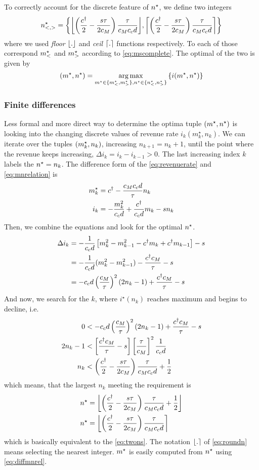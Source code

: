\documentclass[a4paper]{report}
\DeclarePairedDelimiter\floor{\lfloor}{\rfloor}
\DeclarePairedDelimiter\ceil{\lceil}{\rceil}
\DeclarePairedDelimiter{\nint}{\lfloor}{\rceil}
\DeclareMathOperator*{\argmax}{arg\,max}
\begin{document}
To correctly account for the discrete feature of $n^\star$, we define two integers
\def\nsd{\left(\frac{\cd}{2}-\frac{s\tau}{2c_M}\right)\frac{\tau}{c_Mc_cd}}
\begin{equation}
	n^\star_{<,>} = \left\{\floor*{\nsd}, \ceil*{\nsd}\right\}\label{eq:twons}
\end{equation}
where we used \emph{floor} $\floor*{.}$ and \emph{ceil} $\ceil*{.}$ functions respectively. To each of those correspond $m^{\star}_<$ and $m^{\star}_>$ according to \autoref{eq:mscomplete}. The optimal of the two is given by
\begin{equation*}
	(\ms,\ns)=\argmax\limits_{\ms\in\{\ms_<,\ms_>\},\ns\in\{\ns_<,\ns_>\}}\left\{i(\ms,\ns)\right\}
\end{equation*}

\subsubsection{Finite differences}
Less formal and more direct way to determine the optima tuple $(m^{\star},n^\star)$ is looking into the changing discrete values of revenue rate $i_k(m^\star_k,n_k)$. We can iterate over the tuples $(m^{\star}_k,n_k)$, increasing $n_{k+1}=n_k+1$, until the point where the revenue keeps increasing, $\Delta i_k=i_k-i_{k-1}>0$. The last increasing index $k$ labels the $n^\star=n_k$. The difference form of the \autoref{eq:revenuerate} and \autoref{eq:mnrelation} is
\begin{align}
	m^{\star}_k&=c^{\dagger} - \frac{c_Mc_cd}{\tau} n_k \label{eq:diffmnrel}\\
	i_k&=-\frac{m_k^2}{c_cd}+\frac{c^{\dagger}}{c_cd}m_k-sn_k \label{eq:diffincome}
\end{align}
Then, we combine the equations and look for the optimal $n^\star$.
\begin{align*}
	\Delta i_k	&=-\frac{1}{c_cd}\left[m_k^2-m_{k-1}^2 -c^{\dagger} m_k +c^{\dagger} m_{k-1}\right] - s\\
			&=-\frac{1}{c_cd}(m_k^2-m_{k-1}^2)-\frac{c^{\dagger} c_M}{\tau}-s\\
			&=-c_cd\left(\frac{c_M}{\tau}\right)^2(2n_k-1)+\frac{c^{\dagger} c_M}{\tau}-s
\end{align*}
And now, we search for the $k$, where $i^\star(n_k)$ reaches maximum and begins to decline, i.e.
\begin{align*}
	0&<-c_cd\left(\frac{c_M}{\tau}\right)^2(2n_k-1)+\frac{c^{\dagger} c_M}{\tau}-s\\
	2n_k-1&<\left[\frac{c^{\dagger} c_M}{\tau}-s\right]\left[\frac{\tau}{c_M}\right]^2\frac{1}{c_cd}\\
	n_k&<\left(\frac{c^{\dagger}}{2}-\frac{s\tau}{2c_M}\right)\frac{\tau}{c_Mc_c d}+\frac{1}{2}
\end{align*}
which means, that the largest $n_k$ meeting the requirement is
\begin{align}
	\ns&=\floor*{\left(\frac{\cd}{2}-\frac{s\tau}{2c_M}\right)\frac{\tau}{c_Mc_c d}+\frac{1}{2}}\nonumber\\
	\ns&=\nint*{\left(\frac{\cd}{2}-\frac{s\tau}{2c_M}\right)\frac{\tau}{c_Mc_c d}}\label{eq:roundn}
\end{align}
which is basically equivalent to the \autoref{eq:twons}. The notation $\nint*{.}$ of \autoref{eq:roundn} means selecting the nearest integer. $m^{\star}$ is easily computed from $n^\star$ using \autoref{eq:diffmnrel}.
\end{document}
